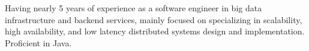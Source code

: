 
Having nearly 5 years of experience as a software engineer in big data infrastructure and backend services, mainly focused on specializing in scalability, high availability, and low latency distributed systems design and implementation. Proficient in Java.  \\


